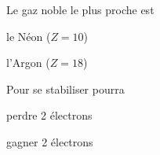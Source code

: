 \begin{multicols}{2}
\begin{qcm}{
    Le gaz noble le plus proche  est
  }
    \item le Néon ($Z = 10$)
    \item l'Argon ($Z = 18$)
  \end{qcm}
  \begin{qcm}{
    Pour se stabiliser  pourra
  }
    \item\reponseQCM perdre 2 électrons
    \item gagner 2 électrons
  \end{qcm}
\end{multicols}